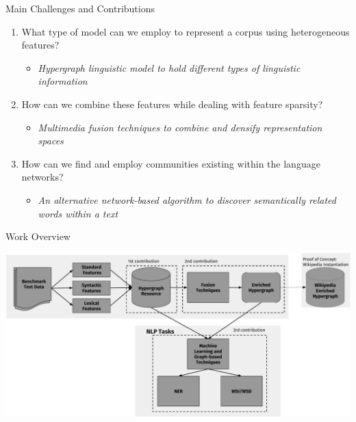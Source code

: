 \documentclass[10pt,xcolor=table]{beamer}
\begin{document}
\begin{frame}{Main Challenges and Contributions}
	\begin{enumerate}[<+- | alert@+>]
		\item What type of model can we employ to represent a corpus using heterogeneous features?
		\begin{itemize}
		\item \textit{Hypergraph linguistic model to hold different types of  linguistic information}
		\end{itemize}
		
		\item How can we combine these features while dealing with feature sparsity?
		\begin{itemize}
		\item \textit{Multimedia fusion techniques to combine and densify representation spaces}	    	 
		\end{itemize}
		\item How can we find and employ communities existing within the language networks?
		\begin{itemize}
		\item \textit{An alternative network-based algorithm to discover semantically related words within a text}
		\end{itemize}
		
	\end{enumerate}%
 \vspace{\textheight}
\end{frame}


\begin{frame}{Work Overview}
\begin{center}
\includegraphics[width=1.04\linewidth]{image2/Chapitre1/main_diag_presi.pdf}
\end{center}

 \vspace{\textheight}
\end{frame}
\end{document}
